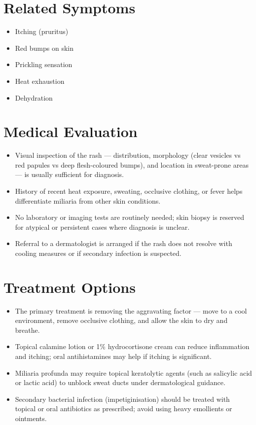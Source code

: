 \section*{Related Symptoms}
\begin{itemize}
  \item Itching (pruritus)
  \item Red bumps on skin
  \item Prickling sensation
  \item Heat exhaustion
  \item Dehydration
\end{itemize}

\section*{Medical Evaluation}
\begin{itemize}
  \item Visual inspection of the rash — distribution, morphology (clear vesicles vs red papules vs deep flesh-coloured bumps), and location in sweat-prone areas — is usually sufficient for diagnosis.
  \item History of recent heat exposure, sweating, occlusive clothing, or fever helps differentiate miliaria from other skin conditions.
  \item No laboratory or imaging tests are routinely needed; skin biopsy is reserved for atypical or persistent cases where diagnosis is unclear.
  \item Referral to a dermatologist is arranged if the rash does not resolve with cooling measures or if secondary infection is suspected.
\end{itemize}

\section*{Treatment Options}
\begin{itemize}
  \item The primary treatment is removing the aggravating factor — move to a cool environment, remove occlusive clothing, and allow the skin to dry and breathe.
  \item Topical calamine lotion or 1\% hydrocortisone cream can reduce inflammation and itching; oral antihistamines may help if itching is significant.
  \item Miliaria profunda may require topical keratolytic agents (such as salicylic acid or lactic acid) to unblock sweat ducts under dermatological guidance.
  \item Secondary bacterial infection (impetiginisation) should be treated with topical or oral antibiotics as prescribed; avoid using heavy emollients or ointments.
\end{itemize}

